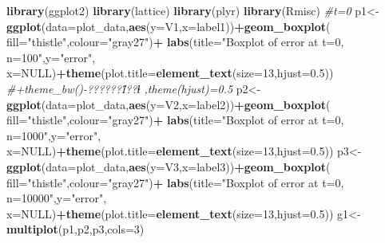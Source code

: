\documentclass[
]{article}
\newenvironment{Shaded}{\begin{snugshade}}{\end{snugshade}}
\newcommand{\CommentTok}[1]{\textcolor[rgb]{0.56,0.35,0.01}{\textit{#1}}}
\newcommand{\DataTypeTok}[1]{\textcolor[rgb]{0.13,0.29,0.53}{#1}}
\newcommand{\DecValTok}[1]{\textcolor[rgb]{0.00,0.00,0.81}{#1}}
\newcommand{\FloatTok}[1]{\textcolor[rgb]{0.00,0.00,0.81}{#1}}
\newcommand{\KeywordTok}[1]{\textcolor[rgb]{0.13,0.29,0.53}{\textbf{#1}}}
\newcommand{\NormalTok}[1]{#1}
\newcommand{\OperatorTok}[1]{\textcolor[rgb]{0.81,0.36,0.00}{\textbf{#1}}}
\newcommand{\OtherTok}[1]{\textcolor[rgb]{0.56,0.35,0.01}{#1}}
\newcommand{\StringTok}[1]{\textcolor[rgb]{0.31,0.60,0.02}{#1}}
\begin{document}
\begin{Shaded}
\begin{Highlighting}[]
\KeywordTok{library}\NormalTok{(ggplot2)}
\KeywordTok{library}\NormalTok{(lattice)}
\KeywordTok{library}\NormalTok{(plyr)}
\KeywordTok{library}\NormalTok{(Rmisc)}
\CommentTok{#t=0}
\NormalTok{p1<-}\KeywordTok{ggplot}\NormalTok{(}\DataTypeTok{data=}\NormalTok{plot_data,}\KeywordTok{aes}\NormalTok{(}\DataTypeTok{y=}\NormalTok{V1,}\DataTypeTok{x=}\NormalTok{label1))}\OperatorTok{+}\KeywordTok{geom_boxplot}\NormalTok{(}
  \DataTypeTok{fill=}\StringTok{"thistle"}\NormalTok{,}\DataTypeTok{colour=}\StringTok{"gray27"}\NormalTok{)}\OperatorTok{+}
\StringTok{  }\KeywordTok{labs}\NormalTok{(}\DataTypeTok{title=}\StringTok{"Boxplot of error at t=0, n=100"}\NormalTok{,}\DataTypeTok{y=}\StringTok{"error"}\NormalTok{,}
       \DataTypeTok{x=}\OtherTok{NULL}\NormalTok{)}\OperatorTok{+}\KeywordTok{theme}\NormalTok{(}\DataTypeTok{plot.title=}\KeywordTok{element_text}\NormalTok{(}\DataTypeTok{size=}\DecValTok{13}\NormalTok{,}\DataTypeTok{hjust=}\FloatTok{0.5}\NormalTok{))}
\CommentTok{#+theme_bw()-??????Ϊ??ɫ ,theme(hjust)=0.5}
\NormalTok{p2<-}\KeywordTok{ggplot}\NormalTok{(}\DataTypeTok{data=}\NormalTok{plot_data,}\KeywordTok{aes}\NormalTok{(}\DataTypeTok{y=}\NormalTok{V2,}\DataTypeTok{x=}\NormalTok{label2))}\OperatorTok{+}\KeywordTok{geom_boxplot}\NormalTok{(}
  \DataTypeTok{fill=}\StringTok{"thistle"}\NormalTok{,}\DataTypeTok{colour=}\StringTok{"gray27"}\NormalTok{)}\OperatorTok{+}
\StringTok{  }\KeywordTok{labs}\NormalTok{(}\DataTypeTok{title=}\StringTok{"Boxplot of error at t=0, n=1000"}\NormalTok{,}\DataTypeTok{y=}\StringTok{"error"}\NormalTok{,}
       \DataTypeTok{x=}\OtherTok{NULL}\NormalTok{)}\OperatorTok{+}\KeywordTok{theme}\NormalTok{(}\DataTypeTok{plot.title=}\KeywordTok{element_text}\NormalTok{(}\DataTypeTok{size=}\DecValTok{13}\NormalTok{,}\DataTypeTok{hjust=}\FloatTok{0.5}\NormalTok{))}
\NormalTok{p3<-}\KeywordTok{ggplot}\NormalTok{(}\DataTypeTok{data=}\NormalTok{plot_data,}\KeywordTok{aes}\NormalTok{(}\DataTypeTok{y=}\NormalTok{V3,}\DataTypeTok{x=}\NormalTok{label3))}\OperatorTok{+}\KeywordTok{geom_boxplot}\NormalTok{(}
  \DataTypeTok{fill=}\StringTok{"thistle"}\NormalTok{,}\DataTypeTok{colour=}\StringTok{"gray27"}\NormalTok{)}\OperatorTok{+}
\StringTok{  }\KeywordTok{labs}\NormalTok{(}\DataTypeTok{title=}\StringTok{"Boxplot of error at t=0, n=10000"}\NormalTok{,}\DataTypeTok{y=}\StringTok{"error"}\NormalTok{,}
       \DataTypeTok{x=}\OtherTok{NULL}\NormalTok{)}\OperatorTok{+}\KeywordTok{theme}\NormalTok{(}\DataTypeTok{plot.title=}\KeywordTok{element_text}\NormalTok{(}\DataTypeTok{size=}\DecValTok{13}\NormalTok{,}\DataTypeTok{hjust=}\FloatTok{0.5}\NormalTok{))}
\NormalTok{g1<-}\KeywordTok{multiplot}\NormalTok{(p1,p2,p3,}\DataTypeTok{cols=}\DecValTok{3}\NormalTok{)}


\end{Highlighting}
\end{Shaded}
\end{document}
